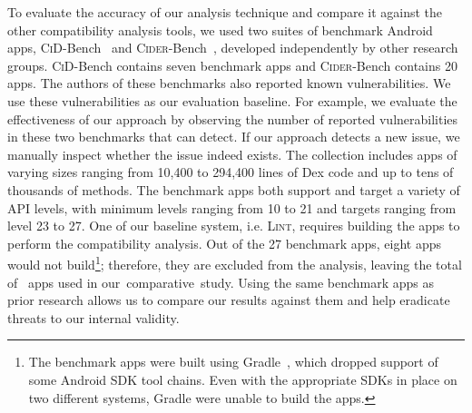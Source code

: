 To evaluate the accuracy of our analysis technique and
compare it against the other compatibility analysis
tools, we used two suites of benchmark Android apps,
\textsc{CiD}-Bench~\cite{lili2018cid} and
\textsc{Cider}-Bench~\cite{huang2018understanding},
developed independently by other research groups.
%
\textsc{CiD}-Bench contains seven benchmark apps and
\textsc{Cider}-Bench contains 20 apps.  The authors of
these benchmarks also reported known vulnerabilities.
We use these vulnerabilities as our evaluation
baseline. For example, we evaluate the effectiveness of
our approach by observing the number of reported
vulnerabilities in these two benchmarks that \@approach
can detect. If our approach detects a new issue, we
manually inspect whether the issue indeed exists.  
%
The collection includes apps of varying sizes ranging
from 10,400 to 294,400 lines of Dex code and up to tens
of thousands of methods. The benchmark apps both
support and target a variety of API levels, with
minimum levels ranging from 10 to 21 and targets
ranging from level 23 to 27.  One of our baseline
system, i.e. \textsc{Lint}, requires building the apps
to perform the compatibility analysis. Out of the 27
benchmark apps, eight apps would not build\footnote{The
benchmark apps were built using Gradle~\cite{Gradle},
which dropped support of some Android SDK tool chains.
Even with the appropriate SDKs in place on two
different systems, Gradle were unable to build the
apps.}; therefore, they are excluded from the analysis,
leaving the total of \rqoneapps~apps used in
our~comparative~study.  Using the same benchmark apps
as prior research allows us to compare our results
against them and help eradicate threats to our internal
validity.

